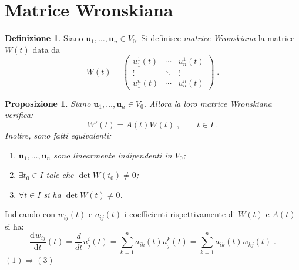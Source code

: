 \documentclass[a4paper,12pt]{report}
\theoremstyle{plain}
\newtheorem{prop}{Proposizione}[section]
\theoremstyle{definition}
\newtheorem{defn}{Definizione}[section]
\theoremstyle{remark}
\newcommand{\dev}[3][]{\frac{\mathrm{d}^{#1}#2}{\mathrm{d}#3^{#1}}}
\numberwithin{equation}{section}
\begin{document}
\section{Matrice Wronskiana}
\begin{defn} Siano $\mathbf{u}_1,\ldots,\mathbf{u}_n \in V_0$. Si definisce \textit{matrice Wronskiana} la matrice $W(t)$ data da
\begin{equation}
W(t)=\begin{pmatrix}
      {u}_1^1(t) & \cdots & {u}_n^1(t) \\
      \vdots & \ddots & \vdots \\
      {u}_1^{n}(t) & \cdots & {u}_n^{n}(t)
     \end{pmatrix}\;.
\end{equation}
\end{defn}
\begin{prop} Siano $\mathbf{u}_1,\ldots,\mathbf{u}_n \in V_0$. Allora la loro matrice Wronskiana verifica:
\begin{equation}
W'(t)=A(t)W(t)\;, \qquad t \in I\;.
\end{equation}
Inoltre, sono fatti equivalenti:
\begin{enumerate}
 \item $\mathbf{u}_1,\ldots,\mathbf{u}_n$ sono linearmente indipendenti in $V_0$;
 \item $\exists t_0 \in I$ tale che $\det{W(t_0)} \ne 0$;
 \item $\forall t \in I$ si ha $\det{W(t)} \ne 0$.
\end{enumerate}
\end{prop}
\proof Indicando con $w_{ij}(t)$ e $a_{ij}(t)$ i coefficienti rispettivamente di $W(t)$ e $A(t)$ si ha:
\begin{equation}
\dev{w_{ij}}{t}(t)=\frac{d}{dt}u_j^i(t)=\sum_{k=1}^na_{ik}(t)u_j^k(t)=\sum_{k=1}^na_{ik}(t)w_{kj}(t)\;.
\end{equation}
\endproof
\proof $(1) \Longrightarrow (3)$ \\
\end{document}
